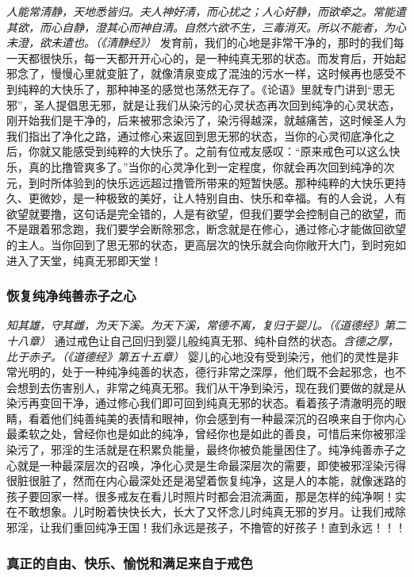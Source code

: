 \textit{人能常清静，天地悉皆归。夫人神好清，而心扰之；人心好静，而欲牵之。常能遣其欲，而心自静，澄其心而神自清。自然六欲不生，三毒消灭。所以不能者，为心未澄，欲未遣也。（《清静经》）} 发育前，我们的心地是非常干净的，那时的我们每一天都很快乐，每一天都开开心心的，是一种纯真无邪的状态。而发育后，开始起邪念了，慢慢心里就变脏了，就像清泉变成了混浊的污水一样，这时候再也感受不到纯粹的大快乐了，那种神圣的感觉也荡然无存了。《论语》里就专门讲到“思无邪”，圣人提倡思无邪，就是让我们从染污的心灵状态再次回到纯净的心灵状态，刚开始我们是干净的，后来被邪念染污了，染污得越深，就越痛苦，这时候圣人为我们指出了净化之路，通过修心来返回到思无邪的状态，当你的心灵彻底净化之后，你就又能感受到纯粹的大快乐了。之前有位戒友感叹：“原来戒色可以这么快乐，真的比撸管爽多了。”当你的心灵净化到一定程度，你就会再次回到纯净的次元，到时所体验到的快乐远远超过撸管所带来的短暂快感。那种纯粹的大快乐更持久、更微妙，是一种极致的美好，让人特别自由、快乐和幸福。有的人会说，人有欲望就要撸，这句话是完全错的，人是有欲望，但我们要学会控制自己的欲望，而不是跟着邪念跑，我们要学会断除邪念，断念就是在修心，通过修心才能做回欲望的主人。当你回到了思无邪的状态，更高层次的快乐就会向你敞开大门，到时宛如进入了天堂，纯真无邪即天堂！

\subsubsection{恢复纯净纯善赤子之心}

\textit{知其雄，守其雌，为天下溪。为天下溪，常德不离，复归于婴儿。（《道德经》第二十八章）} 通过戒色让自己回归到婴儿般纯真无邪、纯朴自然的状态。\textit{含德之厚，比于赤子。（《道德经》第五十五章）} 婴儿的心地没有受到染污，他们的灵性是非常光明的，处于一种纯净纯善的状态，德行非常之深厚，他们既不会起邪念，也不会想到去伤害别人，非常之纯真无邪。我们从干净到染污，现在我们要做的就是从染污再变回干净，通过修心我们即可回到纯真无邪的状态。看着孩子清澈明亮的眼睛，看着他们纯善纯美的表情和眼神，你会感到有一种最深沉的召唤来自于你内心最柔软之处，曾经你也是如此的纯净，曾经你也是如此的善良，可惜后来你被邪淫染污了，邪淫的生活就是在积累负能量，最终你被负能量困住了。纯净纯善赤子之心就是一种最深层次的召唤，净化心灵是生命最深层次的需要，即使被邪淫染污得很脏很脏了，然而在内心最深处还是渴望着恢复纯净，这是人的本能，就像迷路的孩子要回家一样。很多戒友在看儿时照片时都会泪流满面，那是怎样的纯净啊！实在不敢想象。儿时盼着快快长大，长大了又怀念儿时纯真无邪的岁月。让我们戒除邪淫，让我们重回纯净王国！我们永远是孩子，不撸管的好孩子！直到永远！！！

\subsubsection{真正的自由、快乐、愉悦和满足来自于戒色}

